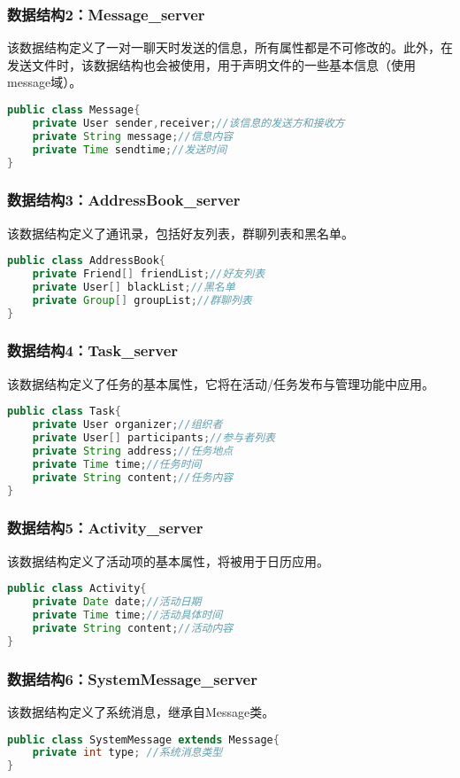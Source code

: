 \subsubsection{数据结构2：Message\_server}
该数据结构定义了一对一聊天时发送的信息，所有属性都是不可修改的。此外，在发送文件时，该数据结构也会被使用，用于声明文件的一些基本信息（使用message域）。
\begin{lstlisting}[language=Java, caption=Message定义]
public class Message{
    private User sender,receiver;//该信息的发送方和接收方
    private String message;//信息内容
    private Time sendtime;//发送时间
}
\end{lstlisting}


\subsubsection{数据结构3：AddressBook\_server}
该数据结构定义了通讯录，包括好友列表，群聊列表和黑名单。
\begin{lstlisting}[language=Java, caption=AddressBook定义]
public class AddressBook{
    private Friend[] friendList;//好友列表
    private User[] blackList;//黑名单
    private Group[] groupList;//群聊列表
}
\end{lstlisting}

\subsubsection{数据结构4：Task\_server}
该数据结构定义了任务的基本属性，它将在活动/任务发布与管理功能中应用。
\begin{lstlisting}[language=Java, caption=Task定义]
public class Task{
    private User organizer;//组织者
    private User[] participants;//参与者列表
    private String address;//任务地点
    private Time time;//任务时间
    private String content;//任务内容
}
\end{lstlisting}

\subsubsection{数据结构5：Activity\_server}
该数据结构定义了活动项的基本属性，将被用于日历应用。
\begin{lstlisting}[language=Java, caption=Activity定义]
public class Activity{
    private Date date;//活动日期
    private Time time;//活动具体时间
    private String content;//活动内容
}
\end{lstlisting}

\subsubsection{数据结构6：SystemMessage\_server}
该数据结构定义了系统消息，继承自Message类。
\begin{lstlisting}[language=Java, caption=SystemMessage定义]
public class SystemMessage extends Message{
    private int type; //系统消息类型
}
\end{lstlisting}

